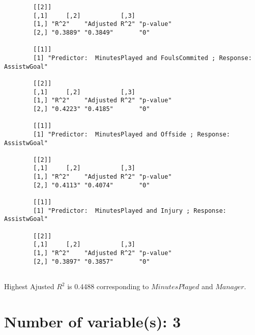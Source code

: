 \documentclass[12pt]{article}
\begin{document}
\begin{verbatim}
		[[2]]
		[,1]     [,2]           [,3]     
		[1,] "R^2"    "Adjusted R^2" "p-value"
		[2,] "0.3889" "0.3849"       "0"      
		
		[[1]]
		[1] "Predictor:  MinutesPlayed and FoulsCommited ; Response:  AssistwGoal"
		
		[[2]]
		[,1]     [,2]           [,3]     
		[1,] "R^2"    "Adjusted R^2" "p-value"
		[2,] "0.4223" "0.4185"       "0"      
		
		[[1]]
		[1] "Predictor:  MinutesPlayed and Offside ; Response:  AssistwGoal"
		
		[[2]]
		[,1]     [,2]           [,3]     
		[1,] "R^2"    "Adjusted R^2" "p-value"
		[2,] "0.4113" "0.4074"       "0"      
		
		[[1]]
		[1] "Predictor:  MinutesPlayed and Injury ; Response:  AssistwGoal"
		
		[[2]]
		[,1]     [,2]           [,3]     
		[1,] "R^2"    "Adjusted R^2" "p-value"
		[2,] "0.3897" "0.3857"       "0"      
		
	\end{verbatim}
	
	Highest Ajusted $ R^2 $ is 0.4488 corresponding to $ MinutesPlayed $ and $ Manager $.
	
	\section{Number of variable(s): 3}
	
\end{document}
